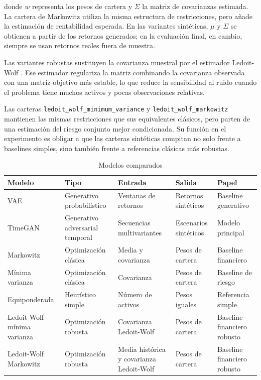 \documentclass[11pt,a4paper,spanish,oneside]{book}
\numberwithin{equation}{chapter}
\numberwithin{figure}{chapter}
\begin{document}
donde $w$ representa los pesos de cartera y $\Sigma$ la matriz de covarianzas estimada. La cartera de Markowitz utiliza la misma estructura de restricciones, pero añade la estimación de rentabilidad esperada. En las variantes sintéticas, $\mu$ y $\Sigma$ se obtienen a partir de los retornos generados; en la evaluación final, en cambio, siempre se usan retornos reales fuera de muestra.

Las variantes robustas sustituyen la covarianza muestral por el estimador Ledoit-Wolf \cite{LedoitWolf2004}. Ese estimador regulariza la matriz combinando la covarianza observada con una matriz objetivo más estable, lo que reduce la sensibilidad al ruido cuando el problema tiene muchos activos y pocas observaciones relativas.

Las carteras \texttt{ledoit\_wolf\_minimum\_variance} y \texttt{ledoit\_wolf\_markowitz} mantienen las mismas restricciones que sus equivalentes clásicos, pero parten de una estimación del riesgo conjunto mejor condicionada. Su función en el experimento es obligar a que las carteras sintéticas compitan no solo frente a baselines simples, sino también frente a referencias clásicas más robustas.
{\footnotesize
\renewcommand{\arraystretch}{1.2}
\setlength{\tabcolsep}{4pt}

\begin{table}[H]
\centering
\begin{tabular}{|p{}|p{}|p{}|p{}|p{}|}
\hline
\textbf{Modelo} & \textbf{Tipo} & \textbf{Entrada} & \textbf{Salida} & \textbf{Papel} \\
\hline
VAE & Generativo probabilístico & Ventanas de retornos & Retornos sintéticos & Baseline generativo \\
\hline
TimeGAN & Generativo adversarial temporal & Secuencias multivariantes & Escenarios sintéticos & Modelo principal \\
\hline
Markowitz & Optimización clásica & Media y covarianza & Pesos de cartera & Baseline financiero \\
\hline
Mínima varianza & Optimización clásica & Covarianza & Pesos de cartera & Baseline de riesgo \\
\hline
Equiponderada & Heurístico simple & Número de activos & Pesos iguales & Referencia simple \\
\hline
Ledoit-Wolf mínima varianza & Optimización robusta & Covarianza Ledoit-Wolf & Pesos de cartera & Baseline financiero robusto \\
\hline
Ledoit-Wolf Markowitz & Optimización robusta & Media histórica y covarianza Ledoit-Wolf & Pesos de cartera & Baseline financiero robusto \\
\hline
\end{tabular}
\caption{Modelos comparados}
\label{tab:modelos-comparados}
\end{table}
}
\end{document}
